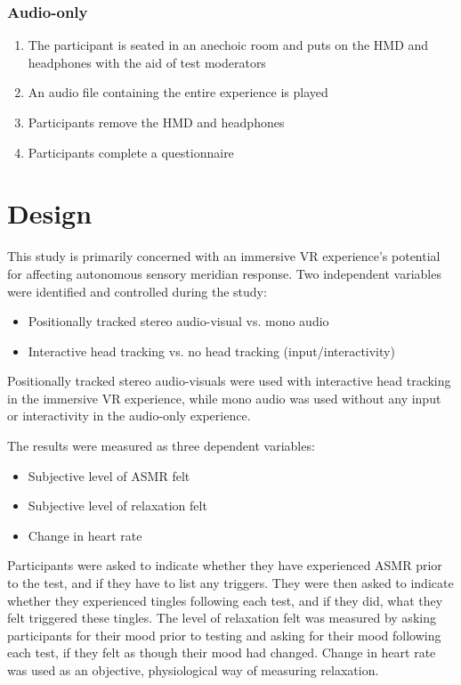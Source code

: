\documentclass{sigchi}
\begin{document}
\subsubsection{Audio-only}
\begin{enumerate}
\item{The participant is seated in an anechoic room and puts on the HMD and headphones with the aid of test moderators}
\item{An audio file containing the entire experience is played}
\item{Participants remove the HMD and headphones}
\item{Participants complete a questionnaire}
\end{enumerate}






\section{Design}
This study is primarily concerned with an immersive VR experience's potential for affecting autonomous sensory meridian response. Two independent variables were identified and controlled during the study:
\begin{itemize}
\item{Positionally tracked stereo audio-visual vs. mono audio}
\item{Interactive head tracking vs. no head tracking (input/interactivity)}
\end{itemize}

Positionally tracked stereo audio-visuals were used with interactive head tracking in the immersive VR experience, while mono audio was used without any input or interactivity in the audio-only experience.

The results were measured as three dependent variables:

\begin{itemize}
\item{Subjective level of ASMR felt}
\item{Subjective level of relaxation felt}
\item{Change in heart rate}
\end{itemize}

Participants were asked to indicate whether they have experienced ASMR prior to the test, and if they have to list any triggers. They were then asked to indicate whether they experienced tingles following each test, and if they did, what they felt triggered these tingles. The level of relaxation felt was measured by asking participants for their mood prior to testing and asking for their mood following each test, if they felt as though their mood had changed. Change in heart rate was used as an objective, physiological way of measuring relaxation.
\end{document}
